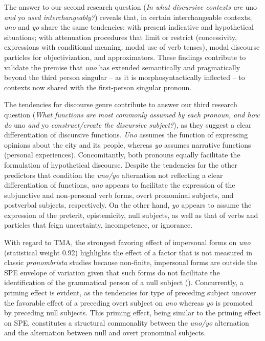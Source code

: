 \documentclass[output=paper]{langscibook}
\begin{document}
The answer to our second research question (\textit{In what discursive contexts are} uno \textit{and} yo \textit{used interchangeably?}) reveals that, in certain interchangeable contexts, \textit{uno} and \textit{yo} share the same tendencies: with present indicative and hypothetical situations; with attenuation procedures that limit or restrict (concessivity, expressions with conditional meaning, modal use of verb tenses), modal discourse particles for objectivization, and approximators. These findings contribute to validate the premise that \textit{uno} has extended semantically and pragmatically beyond the third person singular – as it is morphosyntactically inflected – to contexts now shared with the first-person singular pronoun.  



The tendencies for discourse genre contribute to answer our third research question (\textit{What functions are most commonly assumed by each pronoun, and how do} uno \textit{and} yo \textit{construct/create the discursive subject?}), as they suggest a clear differentiation of discursive functions. \textit{Uno} assumes the function of expressing opinions about the city and its people, whereas \textit{yo} assumes narrative functions (personal experiences). Concomitantly, both pronouns equally facilitate the formulation of hypothetical discourse. Despite the tendencies for the other predictors that condition the \textit{uno/yo} alternation not reflecting a clear differentiation of functions, \textit{uno} appears to facilitate the expression of the subjunctive and non-personal verb forms, overt pronominal subjects, and postverbal subjects, respectively. On the other hand, \textit{yo} appears to assume the expression of the preterit, epistemicity, null subjects, as well as that of verbs and particles that feign uncertainty, incompetence, or ignorance.   



With regard to TMA, the strongest favoring effect of impersonal forms on \textit{uno} (statistical weight 0.92) highlights the effect of a factor that is not measured in classic \textit{pronombrista} studies because non-finite, impersonal forms are outside the SPE envelope of variation given that such forms do not facilitate the identification of the grammatical person of a null subject (\citealt{OtheguyZentella2012, Orozco2018}). Concurrently, a priming effect is evident, as the tendencies for type of preceding subject uncover the favorable effect of a preceding overt subject on \textit{uno} whereas \textit{yo} is promoted by preceding null subjects. This priming effect, being similar to the priming effect on SPE, constitutes a structural commonality between the \textit{uno/yo} alternation and the alternation between null and overt pronominal subjects.   
\end{document}
